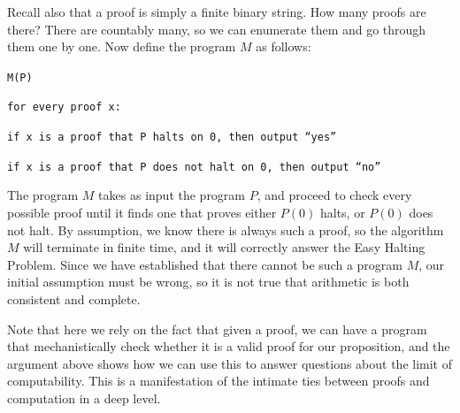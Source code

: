 \documentclass[11pt,fleqn]{article}
\begin{document}
Recall also that a proof is simply a finite binary string. How many proofs are there? There are countably many, so we can enumerate them and go through them one by one. Now define the program $M$ as follows:

\hspace{.5in} \texttt{M(P)}

\hspace{.7in} \texttt{for every proof x:}

\hspace{.9in} \texttt{if x is a proof that P halts on 0, then output ``yes''}

\hspace{.9in} \texttt{if x is a proof that P does not halt on 0, then output ``no''}

\vspace{.1cm}

The program $M$ takes as input the program $P$, and proceed to check every possible proof until it finds one that proves either $P(0)$ halts, or $P(0)$ does not halt. By assumption, we know there is always such a proof, so the algorithm $M$ will terminate in finite time, and it will correctly answer the Easy Halting Problem. Since we have established that there cannot be such a program $M$, our initial assumption must be wrong, so it is not true that arithmetic is both consistent and complete.

Note that here we rely on the fact that given a proof, we can have a program that mechanistically check whether it is a valid proof for our proposition, and the argument above shows how we can use this to answer questions about the limit of computability. This is a manifestation of the intimate ties between proofs and computation in a deep level.
\end{document}
